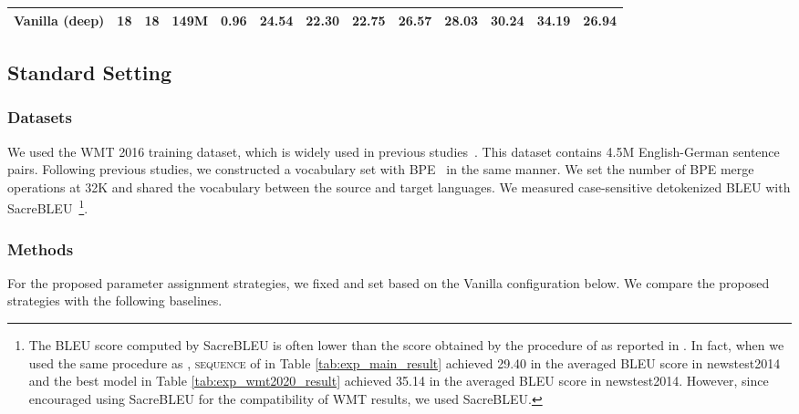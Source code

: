 \documentclass[11pt]{article}
\begin{document}
\begin{table*}[!t]
\begin{tabular}{ l | c c | r | r | c c c c c c c | c}
  Vanilla (deep) & 18 & 18 & 149M & 0.96 & 24.54 & 22.30 & 22.75 & 26.57 & 28.03 & 30.24 & 34.19 & 26.94 \\ \hline
  \end{tabular}
  \caption{The number of layers, number of parameters, computational speeds based on the Universal configuration, BLEU scores on newstest2010-2016, and averaged scores when we trained each method on widely used WMT 2016 English-to-German training dataset. Scores in bold denote the best results for each set. The results of our proposed strategies are statistically significant () in comparison with Universal. The lowest part indicates results of methods consisting of a large number of parameters for reference.\label{tab:exp_main_result}}
\end{table*}


\subsection{Standard Setting}
\label{sec:exp_standard_setting}

\subsubsection{Datasets}
We used the WMT 2016 training dataset, which is widely used in previous studies~\cite{NIPS2017_7181,ott-etal-2018-scaling,takase-kiyono-2021-rethinking}.
This dataset contains 4.5M English-German sentence pairs.
Following previous studies, we constructed a vocabulary set with BPE~\cite{sennrich-etal-2016-neural} in the same manner.
We set the number of BPE merge operations at 32K and shared the vocabulary between the source and target languages.
We measured case-sensitive detokenized BLEU with SacreBLEU~\cite{post-2018-call}\footnote{The BLEU score computed by SacreBLEU is often lower than the score obtained by the procedure of  as reported in . In fact, when we used the same procedure as , \textsc{sequence} of  in Table \ref{tab:exp_main_result} achieved 29.40 in the averaged BLEU score in newstest2014 and the best model in Table \ref{tab:exp_wmt2020_result} achieved 35.14 in the averaged BLEU score in newstest2014. However, since  encouraged using SacreBLEU for the compatibility of WMT results, we used SacreBLEU.}.


\subsubsection{Methods}
For the proposed parameter assignment strategies, we fixed  and set  based on the Vanilla configuration below.
We compare the proposed strategies with the following baselines.
\end{document}
